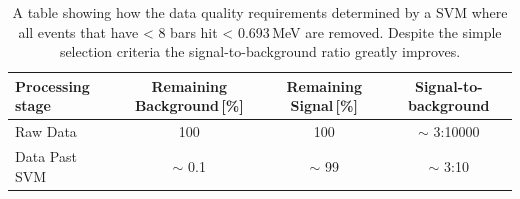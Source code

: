 \begin{table}[!h]
\centering
\begin{tabular}{lccc}  
\toprule
Processing stage & Remaining Background\,[\%] & Remaining Signal\,[\%] & Signal-to-background \\
\midrule
Raw Data         & 100                        & 100             & $\sim$ 3:10000\\
Data Past SVM    & $\sim$ 0.1                 & $\sim$ 99       & $\sim$ 3:10\\
\bottomrule  
\end{tabular}
\caption{A table showing how the data quality requirements determined by a SVM where all events that have < 8 bars hit < 0.693\,MeV are removed. Despite the simple selection criteria the signal-to-background ratio greatly improves.}
\label{tab:snRatioSvm}
\end{table}

